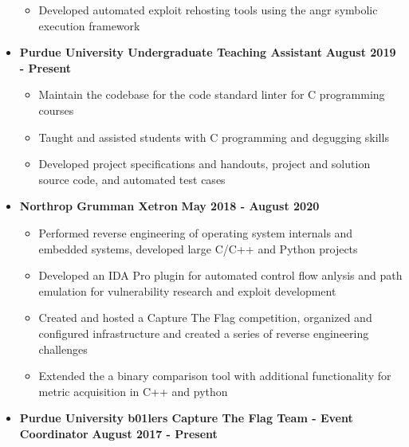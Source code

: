 \documentclass[letterpaper,10pt]{article}
\begin{document}
\begin{flushleft}
\begin{itemize}
            \begin{itemize}
                \item Developed automated exploit rehosting tools using the angr symbolic execution framework \\
            \end{itemize}
        \item \textbf{Purdue University Undergraduate Teaching Assistant} \hfill \textbf{August 2019 - Present} \\
            \begin{itemize}
                \item Maintain the codebase for the code standard linter for C programming courses \\
                \item Taught and assisted students with C programming and degugging skills \\
                \item Developed project specifications and handouts, project and solution source code, and automated test cases \\
            \end{itemize}
		\item \textbf{Northrop Grumman Xetron} \hfill \textbf{May 2018 - August 2020} \\
			\begin{itemize}
                \item Performed reverse engineering of operating system internals and embedded systems, developed large C/C++ and Python projects \\
				\item Developed an IDA Pro plugin for automated control flow anlysis and path emulation for vulnerability research and exploit development \\
				\item Created and hosted a Capture The Flag competition, organized and configured infrastructure and created a series of reverse engineering challenges \\
				\item Extended the a binary comparison tool with additional functionality for metric acquisition in C++ and python \\
			\end{itemize}
		\item \textbf{Purdue University b01lers Capture The Flag Team - Event Coordinator} \hfill \textbf{August 2017 - Present} \\

\end{itemize}
\end{flushleft}
\end{document}
